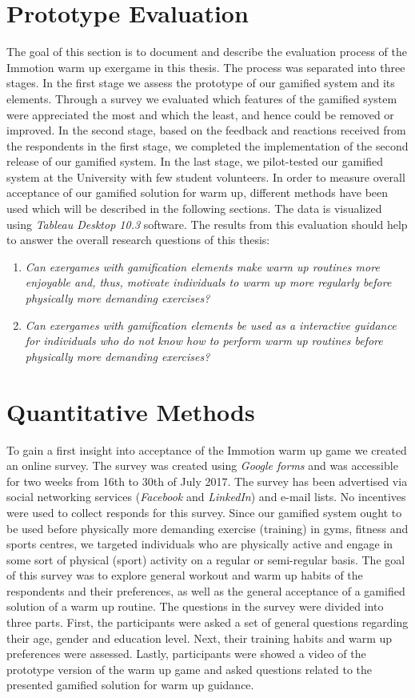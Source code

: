\section{Prototype Evaluation}
The goal of this section is to document and describe the evaluation process of the Immotion warm up exergame in this thesis. The process was separated into three stages. In the first stage we assess the prototype of our gamified system and its elements. Through a survey we evaluated which features of the gamified system were appreciated the most and which the least, and hence could be removed or improved. In the second stage, based on the feedback and reactions received from the respondents in the first stage, we completed the implementation of the second release of our gamified system. In the last stage, we pilot-tested our gamified system at the University with few student volunteers. In order to measure overall acceptance of our gamified solution for warm up, different methods have been used which will be described in the following sections. The data is visualized using \textit{Tableau Desktop 10.3} software. The results from this evaluation should help to answer the overall research questions of this thesis:
\begin{enumerate}
\item \textit{Can exergames with gamification elements make warm up routines more enjoyable and, thus, motivate individuals to warm up more regularly before physically more demanding exercises?}
\item \textit{Can exergames with gamification elements be used as a interactive guidance for individuals who do not know how to perform warm up routines before physically more demanding exercises?}
\end{enumerate}
\section{Quantitative Methods}
To gain a first insight into acceptance of the Immotion warm up game we created an online survey. The survey was created using \textit{Google forms} and was accessible for two weeks from 16th to 30th of July 2017. The survey has been advertised via social networking services (\textit{Facebook} and \textit{LinkedIn}) and e-mail lists. No incentives were used to collect responds for this survey. Since our gamified system ought to be used before physically more demanding exercise (training) in gyms, fitness and sports centres, we targeted individuals who are physically active and engage in some sort of physical (sport) activity on a regular or semi-regular basis. The goal of this survey was to explore general workout and warm up habits of the respondents and their preferences, as well as the general acceptance of a gamified solution of a warm up routine. The questions in the survey were divided into three parts. First, the participants were asked a set of general questions regarding their age, gender and education level. Next, their training habits and warm up preferences were assessed. Lastly, participants were showed a video of the prototype version of the warm up game and asked questions related to the presented gamified solution for warm up guidance. 


